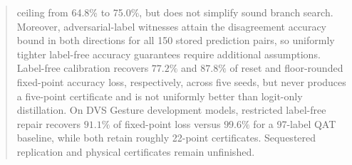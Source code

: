 \documentclass{article}
\begin{document}
\begin{abstract}
ceiling from 64.8\% to 75.0\%, but does not simplify sound branch search.
Moreover,
adversarial-label witnesses attain the disagreement accuracy bound in both
directions for all 150 stored prediction pairs, so uniformly tighter label-free
accuracy guarantees require additional assumptions. Label-free calibration
recovers $77.2\%$ and $87.8\%$ of reset and floor-rounded fixed-point accuracy
loss, respectively, across five seeds, but never produces a five-point
certificate and is not uniformly better than logit-only distillation. On DVS
Gesture development models, restricted label-free repair recovers $91.1\%$ of
fixed-point loss versus $99.6\%$ for a 97-label QAT baseline, while both retain
roughly 22-point certificates. Sequestered replication and physical certificates
remain unfinished.
\end{abstract}












\appendix

\end{document}

